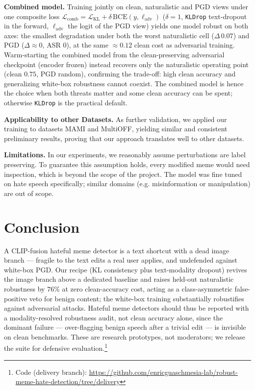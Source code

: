 \documentclass{article}
\begin{document}
\vspace{-5pt}
\textbf{Combined model.} Training jointly on clean, naturalistic and PGD views
under one composite loss
$\mathcal{L}_{\text{comb}}=\mathcal{L}_{\text{KL}}+\delta\,\text{BCE}(y,\ell_{\text{adv}})$
($\delta{=}1$, \texttt{KLDrop} text-dropout in the forward, $\ell_{\text{adv}}$ the
logit of the PGD view) yields one model robust on both axes: the smallest
degradation under both the worst naturalistic cell ($\Delta\,0.07$) and PGD
($\Delta\!\approx\!0$, ASR $0$), at the same $\approx\!0.12$ clean cost as
adversarial training. Warm-starting the combined model from the clean-preserving
adversarial checkpoint (encoder frozen) instead recovers only the naturalistic
operating point (clean $0.75$, PGD random), confirming the trade-off: high clean accuracy and generalizing white-box robustness cannot
coexist. The combined model is hence the choice when both threats matter and
some clean accuracy can be spent; otherwise \texttt{KLDrop} is the practical default.

\vspace{-5pt}
\textbf{Applicability to other Datasets.} As further validation, we applied our training to datasets MAMI and MultiOFF, yielding similar and consistent preliminary results, proving that our approach translates well to other datasets.

\vspace{-5pt}
\textbf{Limitations.} In our experiments, we reasonably assume perturbations are label preserving. To guarantee this assumption holds, every modified meme would need inspection, which is beyond the scope of the project. The model was fine tuned on hate speech specifically; similar domains (e.g. misinformation or manipulation) are out of scope.

\section{Conclusion}
\label{sec:conclusion}

A CLIP-fusion hateful meme detector is a text shortcut with a dead image branch
--- fragile to the text edits a real user applies, and undefended against
white-box PGD. Our recipe (KL consistency plus text-modality dropout) revives the
image branch above a dedicated baseline and raises held-out naturalistic
robustness by $76\%$ at zero clean-accuracy cost, acting as a class-asymmetric
false-positive veto for benign content; the white-box training substantially robustifies against adversarial attacks. Hateful meme detectors should thus be reported with a
modality-resolved robustness audit, not clean accuracy alone, since the dominant
failure --- over-flagging benign speech after a trivial edit --- is invisible on
clean benchmarks. These are research prototypes, not moderators; we release the
suite for defensive evaluation.\footnote{\tiny Code (delivery branch): \url{https://github.com/enricguaschmesia-lab/robust-meme-hate-detection/tree/delivery}}
\end{document}
